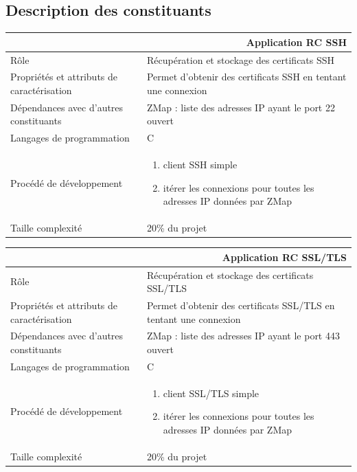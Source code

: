 \documentclass[a4paper,11pt,french]{article}
\begin{document}
\subsection{Description des constituants}


\begin{center}
	\vspace*{0.7cm}
	\begin{tabularx}{16cm}{|l|X|}
	\hline
	\multicolumn{2}{|r|}{\textbf{Application RC SSH}}\\
	\hline
	R\^ole & Récupération et stockage des certificats SSH \\
	\hline
	Propriétés et attributs de caractérisation & Permet d'obtenir des certificats SSH en tentant une connexion  \\
	\hline
	Dépendances avec d'autres constituants & ZMap : liste des adresses IP ayant le port 22 ouvert\\
	\hline
	Langages de programmation & C \\
	\hline
	Procédé de développement & \begin{enumerate} \item client SSH simple \item itérer les connexions pour toutes les adresses IP données par ZMap \end{enumerate} \\
	\hline
	Taille complexité & 20\% du projet\\
	\hline
	\end{tabularx}
\end{center}

\begin{center}
	\vspace*{0.7cm}
	\begin{tabularx}{16cm}{|l|X|}
	\hline
	\multicolumn{2}{|r|}{\textbf{Application RC SSL/TLS}}\\
	\hline
	R\^ole & Récupération et stockage des certificats SSL/TLS \\
	\hline
	Propriétés et attributs de caractérisation & Permet d'obtenir des certificats SSL/TLS en tentant une connexion  \\
	\hline
	Dépendances avec d'autres constituants & ZMap : liste des adresses IP ayant le port 443 ouvert\\
	\hline
	Langages de programmation & C \\
	\hline
	Procédé de développement & \begin{enumerate} \item client SSL/TLS simple \item itérer les connexions pour toutes les adresses IP données par ZMap \end{enumerate} \\
	\hline
	Taille complexité & 20\% du projet\\
	\hline
	\end{tabularx}
\end{center}
\end{document}
